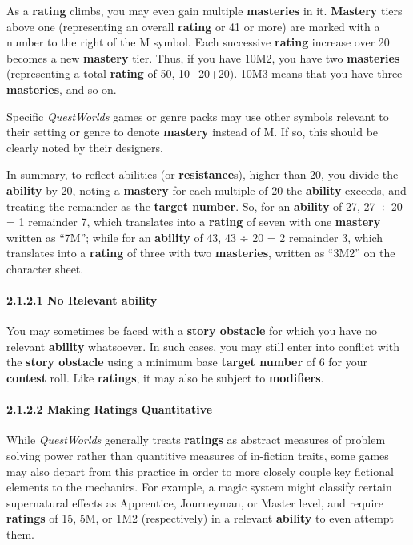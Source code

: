 \documentclass[
]{article}
\begin{document}
As a \textbf{rating} climbs, you may even gain multiple
\textbf{masteries} in it. \textbf{Mastery} tiers above one (representing
an overall \textbf{rating} or 41 or more) are marked with a number to
the right of the M symbol. Each successive \textbf{rating} increase over
20 becomes a new \textbf{mastery} tier. Thus, if you have 10M2, you have
two \textbf{masteries} (representing a total \textbf{rating} of 50,
10+20+20). 10M3 means that you have three \textbf{masteries}, and so on.

Specific \emph{QuestWorlds} games or genre packs may use other symbols
relevant to their setting or genre to denote \textbf{mastery} instead of
M. If so, this should be clearly noted by their designers.

In summary, to reflect abilities (or \textbf{resistance}s), higher than
20, you divide the \textbf{ability} by 20, noting a \textbf{mastery} for
each multiple of 20 the \textbf{ability} exceeds, and treating the
remainder as the \textbf{target number}. So, for an \textbf{ability} of
27, 27 ÷ 20 = 1 remainder 7, which translates into a \textbf{rating} of
seven with one \textbf{mastery} written as ``7M''; while for an
\textbf{ability} of 43, 43 ÷ 20 = 2 remainder 3, which translates into a
\textbf{rating} of three with two \textbf{masteries}, written as ``3M2''
on the character sheet.

\hypertarget{no-relevant-ability}{%
\paragraph{\texorpdfstring{2.1.2.1 No Relevant
\textbf{ability}}{2.1.2.1 No Relevant ability}}\label{no-relevant-ability}}

You may sometimes be faced with a \textbf{story obstacle} for which you
have no relevant \textbf{ability} whatsoever. In such cases, you may
still enter into conflict with the \textbf{story obstacle} using a
minimum base \textbf{target number} of 6 for your \textbf{contest} roll.
Like \textbf{ratings}, it may also be subject to \textbf{modifiers}.

\hypertarget{making-ratings-quantitative}{%
\paragraph{2.1.2.2 Making Ratings
Quantitative}\label{making-ratings-quantitative}}

While \emph{QuestWorlds} generally treats \textbf{ratings} as abstract
measures of problem solving power rather than quantitive measures of
in-fiction traits, some games may also depart from this practice in
order to more closely couple key fictional elements to the mechanics.
For example, a magic system might classify certain supernatural effects
as Apprentice, Journeyman, or Master level, and require \textbf{ratings}
of 15, 5M, or 1M2 (respectively) in a relevant \textbf{ability} to even
attempt them.
\end{document}
